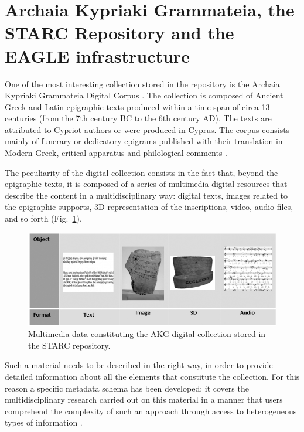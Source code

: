 \documentclass[amsthm,ebook]{saparticle}
\begin{document}
\section{Archaia Kypriaki Grammateia, the STARC Repository and the EAGLE infrastructure}


\noindent One of the most interesting collection stored in the repository is the Archaia Kypriaki Grammateia Digital Corpus
\citep{pitzalis_building_2012}. The collection is composed of Ancient Greek and Latin epigraphic texts produced within a time
span of circa 13 centuries (from the 7th century BC to the 6th century AD). The texts are attributed to Cypriot authors
or were produced in Cyprus. The corpus consists mainly of funerary or dedicatory epigrams published with their
translation in Modern Greek, critical apparatus and philological comments \citep{voskos__1997}. 

The peculiarity of the digital collection consists in the fact that, beyond the epigraphic texts, it is composed of a
series of multimedia digital resources that describe the content in a multidisciplinary way: digital texts, images
related to the epigraphic supports, 3D representation of the inscriptions, video, audio files, and so forth (Fig.~\ref{fig:4}).




\begin{figure}[!hbp]
\centering
 \includegraphics[width=\columnwidth]{DamnjanovicetalEAGLE2016-img004.jpg}
\caption{Multimedia data constituting the AKG digital collection stored in the STARC repository.}
\label{fig:4}
\end{figure}

Such a material needs to be described in the right way, in order to provide detailed information about all the elements
that constitute the collection. For this reason a specific metadata schema has been developed: it covers the
multidisciplinary research carried out on this material in a manner that users comprehend the complexity of such an
approach through access to heterogeneous types of information \citep{vassallo_revealing_2013}.
\end{document}
